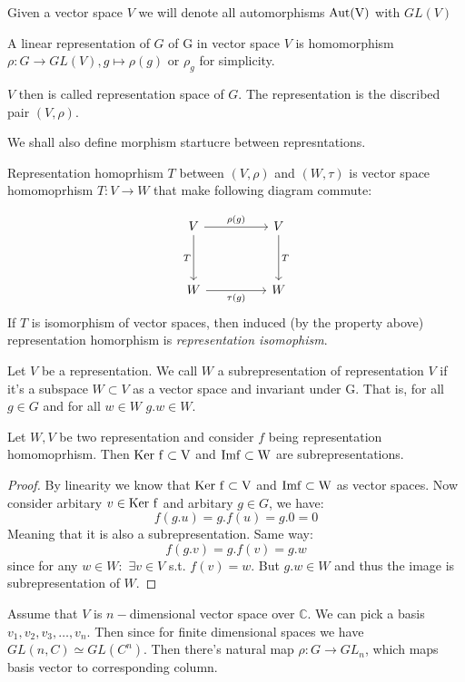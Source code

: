 \documentclass{amsart}
\def\aut{\rm Aut}
\def\ker{\rm Ker\ }
\def\im{\rm Im}
\begin{document}
\begin{definition}
    Given a vector space $V$ we will denote all automorphisms $\aut(V)$ with $GL(V)$
\end{definition}

\begin{definition}
    A linear representation of $G$ of G in vector space $V$ is homomorphism $\rho: G \to GL(V), g \mapsto \rho(g)$ or $\rho_g$ for simplicity.
\end{definition}

$V$ then is called representation space of $G$. The representation is the discribed pair $(V, \rho)$.

We shall also define morphism startucre between represntations.

\begin{definition}
 Representation homoprhism $T$ between $(V, \rho)$ and $(W, \tau)$ is vector space homomoprhism $T: V \to W$ that make following diagram commute:
\end{definition}


\[\begin{tikzcd}
	V && V \\
	\\
	W && W
	\arrow["{\rho(g)}", from=1-1, to=1-3]
	\arrow["T", from=1-3, to=3-3]
	\arrow["T"', from=1-1, to=3-1]
	\arrow["{\tau(g)}"', from=3-1, to=3-3]
\end{tikzcd}\]
If $T$ is isomorphism of vector spaces, then induced (by the property above) representation homorphism is \textit{representation isomophism}.


\begin{definition}
    Let $V$ be a representation. We call $W$ a subrepresentation of representation $V$ if it's a subspace $W \subset V$ as a vector space and invariant under G. That is, for all $g \in G$ and for all $w \in W$ $g.w \in W$.
\end{definition}

\begin{lemma}
    Let $W, V$ be two representation and consider $f$ being representation homomoprhism.
    Then $\ker f \subset V$ and 
    $\im f \subset W$ are subrepresentations.
\end{lemma}

\begin{proof}
    By linearity we know that $\ker f \subset V$ and $\im f \subset W$ as vector spaces. Now consider arbitary $v \in \ker f$ and arbitary $g \in G$, we have:
    $$ f(g.u) = g . f(u) = g . 0 = 0$$
    Meaning that it is also a subrepresentation. Same way:
    $$ f(g.v) = g. f(v) = g.w$$
    since for any $w \in W:$ $\exists v \in V$ s.t. $f(v)=w$. But $g.w \in W$ and thus the image is subrepresentation of $W$.
\end{proof}
Assume that $V$ is $n-$dimensional vector space over $\mathbb{C}$. We can pick a basis $v_1, v_2, v_3,\dots, v_n$. Then since for finite dimensional spaces we have $GL(n, C) \simeq GL(C^n)$. Then there's natural map $\rho: G\to GL_n$, which maps basis vector to corresponding column.
\end{document}
